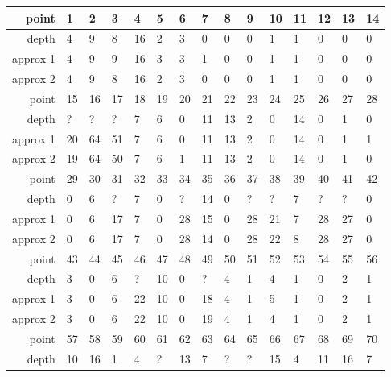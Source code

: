 \begin{center}
  \tablefirsthead{\hline}
  \tablelasttail{\hline}
  \begin{supertabular}{|r|l l l l l l l l l l l l l l|}
\hline
point & 1 & 2 & 3 & 4 & 5 & 6 & 7 & 8 & 9 & 10 & 11 & 12 & 13 & 14 \\
\hline
depth & 4 & 9 & 8 & 16 & 2 & 3 & 0 & 0 & 0 & 1 & 1 & 0 & 0 & 0 \\
approx 1 & 4 & 9 & 9 & 16 & 3 & 3 & 1 & 0 & 0 & 1 & 1 & 0 & 0 & 0 \\
approx 2 & 4 & 9 & 8 & 16 & 2 & 3 & 0 & 0 & 0 & 1 & 1 & 0 & 0 & 0 \\
\hline
point & 15 & 16 & 17 & 18 & 19 & 20 & 21 & 22 & 23 & 24 & 25 & 26 & 27 & 28 \\
\hline
depth & ? & ? & ? & 7 & 6 & 0 & 11 & 13 & 2 & 0 & 14 & 0 & 1 & 0 \\
approx 1 & 20 & 64 & 51 & 7 & 6 & 0 & 11 & 13 & 2 & 0 & 14 & 0 & 1 & 1 \\
approx 2 & 19 & 64 & 50 & 7 & 6 & 1 & 11 & 13 & 2 & 0 & 14 & 0 & 1 & 0 \\
\hline
point & 29 & 30 & 31 & 32 & 33 & 34 & 35 & 36 & 37 & 38 & 39 & 40 & 41 & 42 \\
\hline
depth & 0 & 6 & ? & 7 & 0 & ? & 14 & 0 & ? & ? & 7 & ? & ? & 0 \\
approx 1 & 0 & 6 & 17 & 7 & 0 & 28 & 15 & 0 & 28 & 21 & 7 & 28 & 27 & 0 \\
approx 2 & 0 & 6 & 17 & 7 & 0 & 28 & 14 & 0 & 28 & 22 & 8 & 28 & 27 & 0 \\
\hline
point & 43 & 44 & 45 & 46 & 47 & 48 & 49 & 50 & 51 & 52 & 53 & 54 & 55 & 56 \\
\hline
depth & 3 & 0 & 6 & ? & 10 & 0 & ? & 4 & 1 & 4 & 1 & 0 & 2 & 1 \\
approx 1 & 3 & 0 & 6 & 22 & 10 & 0 & 18 & 4 & 1 & 5 & 1 & 0 & 2 & 1 \\
approx 2 & 3 & 0 & 6 & 22 & 10 & 0 & 19 & 4 & 1 & 4 & 1 & 0 & 2 & 1 \\
\hline
point & 57 & 58 & 59 & 60 & 61 & 62 & 63 & 64 & 65 & 66 & 67 & 68 & 69 & 70 \\
\hline
depth & 10 & 16 & 1 & 4 & ? & 13 & 7 & ? & ? & 15 & 4 & 11 & 16 & 7 \\

\end{supertabular}
\end{center}
